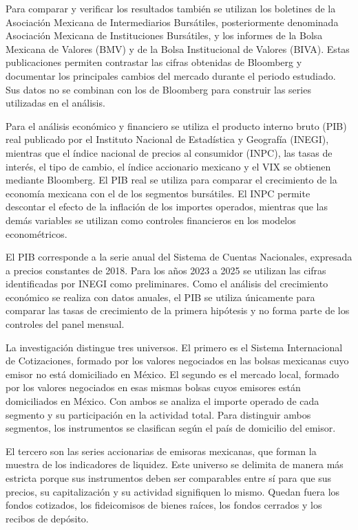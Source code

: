Para comparar y verificar los resultados también se utilizan los boletines de la Asociación Mexicana de Intermediarios Bursátiles, posteriormente denominada Asociación Mexicana de Instituciones Bursátiles, y los informes de la Bolsa Mexicana de Valores (BMV) y de la Bolsa Institucional de Valores (BIVA). Estas publicaciones permiten contrastar las cifras obtenidas de Bloomberg y documentar los principales cambios del mercado durante el periodo estudiado. Sus datos no se combinan con los de Bloomberg para construir las series utilizadas en el análisis.

Para el análisis económico y financiero se utiliza el producto interno bruto (PIB) real publicado por el Instituto Nacional de Estadística y Geografía (INEGI), mientras que el índice nacional de precios al consumidor (INPC), las tasas de interés, el tipo de cambio, el índice accionario mexicano y el VIX se obtienen mediante Bloomberg. El PIB real se utiliza para comparar el crecimiento de la economía mexicana con el de los segmentos bursátiles. El INPC permite descontar el efecto de la inflación de los importes operados, mientras que las demás variables se utilizan como controles financieros en los modelos econométricos.

El PIB corresponde a la serie anual del Sistema de Cuentas Nacionales, expresada a precios constantes de 2018. Para los años 2023 a 2025 se utilizan las cifras identificadas por INEGI como preliminares. Como el análisis del crecimiento económico se realiza con datos anuales, el PIB se utiliza únicamente para comparar las tasas de crecimiento de la primera hipótesis y no forma parte de los controles del panel mensual.


La investigación distingue tres universos. El primero es el Sistema Internacional de Cotizaciones, formado por los valores negociados en las bolsas mexicanas cuyo emisor no está domiciliado en México. El segundo es el mercado local, formado por los valores negociados en esas mismas bolsas cuyos emisores están domiciliados en México. Con ambos se analiza el importe operado de cada segmento y su participación en la actividad total. Para distinguir ambos segmentos, los instrumentos se clasifican según el país de domicilio del emisor.

El tercero son las series accionarias de emisoras mexicanas, que forman la muestra de los indicadores de liquidez. Este universo se delimita de manera más estricta porque sus instrumentos deben ser comparables entre sí para que sus precios, su capitalización y su actividad signifiquen lo mismo. Quedan fuera los fondos cotizados, los fideicomisos de bienes raíces, los fondos cerrados y los recibos de depósito.

